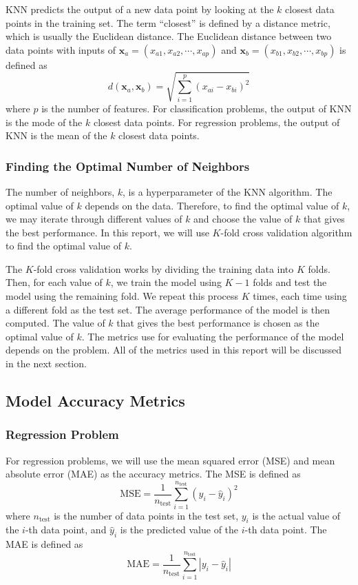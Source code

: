 \documentclass[conf]{new-aiaa}
\begin{document}
KNN predicts the output of a new data point by looking at the $k$ closest data points in the training set. The term ``closest'' is defined by a distance metric, which is usually the Euclidean distance. The Euclidean distance between two data points with inputs of $\mathbf{x}_a = \left(x_{a1}, x_{a2}, \cdots, x_{ap}\right)$ and $\mathbf{x}_b = \left(x_{b1}, x_{b2}, \cdots, x_{bp}\right)$ is defined as
\begin{equation} \label{eq:eucliddist}
    d\left(\mathbf{x}_a, \mathbf{x}_b\right) = \sqrt{\sum_{i=1}^p \left(x_{ai} - x_{bi}\right)^2}
\end{equation}
where $p$ is the number of features. 
For classification problems, the output of KNN is the mode of the $k$ closest data points. For regression problems, the output of KNN is the mean of the $k$ closest data points.

\subsubsection{Finding the Optimal Number of Neighbors}
The number of neighbors, $k$, is a hyperparameter of the KNN algorithm. The optimal value of $k$ depends on the data. Therefore, to find the optimal value of $k$, we may iterate through different values of $k$ and choose the value of $k$ that gives the best performance. In this report, we will use $K$-fold cross validation algorithm to find the optimal value of $k$.

The $K$-fold cross validation works by dividing the training data into $K$ folds. Then, for each value of $k$, we train the model using $K-1$ folds and test the model using the remaining fold. We repeat this process $K$ times, each time using a different fold as the test set. The average performance of the model is then computed. The value of $k$ that gives the best performance is chosen as the optimal value of $k$. The metrics use for evaluating the performance of the model depends on the problem. All of the metrics used in this report will be discussed in the next section.

\subsection{Model Accuracy Metrics}
\subsubsection{Regression Problem}
For regression problems, we will use the mean squared error (MSE) and mean absolute error (MAE) as the accuracy metrics. The MSE is defined as
\begin{equation} \label{eq:mse}
    \textrm{MSE} = \frac{1}{n_\textrm{test}} \sum_{i=1}^{n_\textrm{test}} \left(y_i - \hat{y}_i\right)^2
\end{equation}
where $n_\textrm{test}$ is the number of data points in the test set, $y_i$ is the actual value of the $i$-th data point, and $\hat{y}_i$ is the predicted value of the $i$-th data point. The MAE is defined as
\begin{equation} \label{eq:mae}
    \textrm{MAE} = \frac{1}{n_\textrm{test}} \sum_{i=1}^{n_\textrm{test}} \left|y_i - \hat{y}_i\right|
\end{equation}
\end{document}

